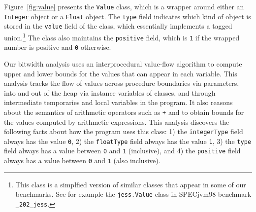 \documentclass{acmconf}
\begin{document}
Figure~\ref{fig:value} presents the {\tt Value} class, which is 
a wrapper around either an {\tt Integer} object or a {\tt Float}
object. The {\tt type} field indicates which kind of object
is stored in the {\tt value} field of the class, 
which essentially implements a tagged 
union.\footnote{This class is a simplfied version of similar
classes that appear in some of our benchmarks.
See for example the {\tt jess.Value} class in SPECjvm98 benchmark
{\tt \_202\_jess}.} 
The class also maintains the {\tt positive} field, which is
{\tt 1} if the wrapped number is positive and {\tt 0} otherwise. 

Our bitwidth analysis uses an interprocedural
value-flow algorithm to compute upper and lower bounds for the
values that can appear in each variable. This analysis tracks
the flow of values across procedure boundaries via parameters,
into and out of the heap via instance variables of classes, and through
intermediate temporaries and local variables in the program.
It also reasons about the semantics of arithmetic operators such
as {\tt +} and {\tt *} to obtain bounds for the values computed
by arithmetic expressions. 
This analysis discovers the following facts about 
how the program uses this class: 1) the {\tt integerType} 
field always has the value {\tt 0}, 2) the {\tt floatType} 
field always has the value {\tt 1}, 3) the {\tt type} 
field always has a value between {\tt 0} and {\tt 1} (inclusive),
and 4) the {\tt positive} field always has a value between 
{\tt 0} and {\tt 1} (also inclusive).
\end{document}
